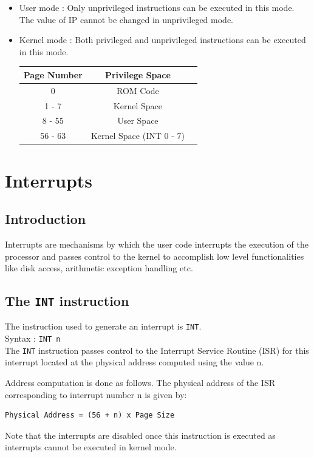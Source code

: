 \documentclass[11pt]{article}
\begin{document}
\begin{itemize}
\item User mode : Only unprivileged instructions can be executed in this mode. The value of IP cannot be changed in unprivileged mode.

\item Kernel mode : Both privileged and unprivileged instructions can be executed in this mode. 

\begin{center}
\begin{tabular}{|c|c|c|}
\hline Page Number & Privilege Space \\ 
\hline 0 & ROM Code \\ 
\hline 1 - 7 & Kernel Space \\ 
\hline 8 - 55 & User Space \\ 
\hline 56 - 63 &  Kernel Space (INT 0 - 7)  \\ 
\hline
\end{tabular} 
\end{center}

\end{itemize}

\section{Interrupts}
\label{sec:int}

\subsection{Introduction}
Interrupts are mechanisms by which the user code interrupts the execution of the processor and passes control to the kernel to accomplish low level functionalities like disk access, arithmetic exception handling etc.\\
\subsection{The \texttt{INT} instruction}
The instruction used to generate an interrupt is \texttt{INT}.\\
Syntax : \texttt{INT n}\\
The \texttt{INT} instruction passes control to the Interrupt Service Routine (ISR) for this interrupt located at the physical address computed using the value n.

Address computation is done as follows. The physical address of the ISR corresponding to interrupt number n is given by: 
\begin{verbatim}
Physical Address = (56 + n) x Page Size
\end{verbatim}
Note that the interrupts are disabled once this instruction is executed as interrupts cannot be executed in kernel mode.
\end{document}
